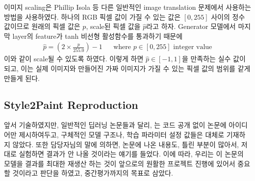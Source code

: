 이미지 scaling은 Phillip Isola \cite{phillip2017}등 다른 일반적인 image translation 문제에서 사용하는 방법을 사용하였다. 하나의 RGB 픽셀 값이 가질 수 있는 값은 $[0, 255]$ 사이의 정수 값이므로 원래의 픽셀 값은 $p$, scale된 픽셀 값을 $\hat{p}$라고 하자. Generator 모델에서 마지막 layer의 feature가 tanh 비선형 활성함수를 통과하기 때문에
\begin{align}
	\hat{p} = (2 \times \frac{p}{255.0}) - 1 && \text{where $p \in [0, 255]$ integer value}
\end{align}
이와 같이 scale될 수 있도록 하였다. 이렇게 하면 $\hat{p} \in [-1, 1]$을 만족하는 실수 값이 되고, 이는 실제 이미지와 만들어진 가짜 이미지가 가질 수 있는 픽셀 값의 범위를 같게 만들게 된다.

\subsection{Style2Paint Reproduction}

앞서 기술하였지만, 일반적인 딥러닝 논문들과 달리, \stylepaint 는 코드 공개 없이 논문에 아이디어만 제시하여두고, 구체적인 모델 구조나, 학습 파라미터 설정 값들은 대체로 기재하지 않았다.
또한 담당자님의 말에 의하면, 논문에 나온 내용도, 틀린 부분이 많아서, 저대로 실험하면 결과가 안 나올 것이라는 얘기를 들었다. 
이에 따라, 우리는 이 논문의 모델을 결과를 최대한 재생산 하는 것이 앞으로의 원활한 프로젝트 진행에 있어서 중요할 것이라고 판단을 하였고, 중간평가까지의 목표로 삼았다.